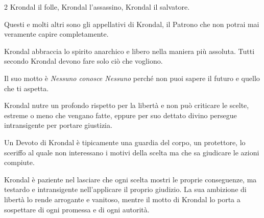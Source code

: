 \begin{multicols}{2}
Krondal il folle, Krondal l'assassino, Krondal il salvatore.

Questi e molti altri sono gli appellativi di Krondal, il Patrono che non potrai mai veramente capire completamente.

Krondal abbraccia lo spirito anarchico e libero nella maniera più assoluta. Tutti secondo Krondal devono fare solo ciò che vogliono.

Il suo motto è \emph{Nessuno conosce Nessuno} perché non puoi sapere il futuro e quello che ti aspetta.

Krondal nutre un profondo rispetto per la libertà e non può criticare le scelte, estreme o meno che vengano fatte, eppure per suo dettato divino persegue intransigente per portare giustizia.

Un Devoto di Krondal è tipicamente una guardia del corpo, un protettore, lo sceriffo al quale non interessano i motivi della scelta ma che sa giudicare le azioni compiute.

Krondal è paziente nel lasciare che ogni scelta mostri le proprie conseguenze, ma testardo e intransigente nell'applicare il proprio giudizio. La sua ambizione di libertà lo rende arrogante e vanitoso, mentre il motto di Krondal lo porta a sospettare di ogni promessa e di ogni autorità.


\end{multicols}
